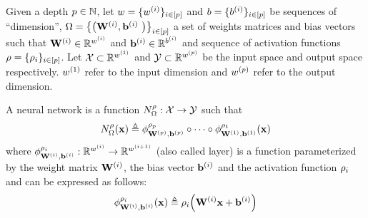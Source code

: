 \begin{definition}
  Given a depth $p \in \mathbb{N}$, 
  let $w = \{ w^{(i)} \}_{i \in [p]}$ and $b = \{ b^{(i)} \}_{i \in [p]}$ be sequences of ``dimension'', $\weights = \left\{ \left( \Wmat^{(i)}, \bvec^{(i)} \right) \right\}_{i \in [\depth]}$ a set of weights matrices and bias vectors 
  such that $\mathbf{W}^{(i)} \in \mathbb{R}^{w^{(i)}}$ and $\mathbf{b}^{(i)} \in \mathbb{R}^{b^{(i)}}$ and sequence of activation functions $\rho = \{\rho_i \}_{i \in [p]}$.
  Let $\mathcal{X} \subset \mathbb{R}^{w^{(1)}}$ and $\mathcal{Y} \subset \mathbb{R}^{w^{(p)}}$ be the input space and output space respectively. 
  $w^{(1)}$ refer to the input dimension and $w^{(p)}$ refer to the output dimension.
  
  \noindent
  A neural network is a function $N^\rho_\Omega : \mathcal{X} \rightarrow \mathcal{Y}$ such that
  \begin{equation}
    N^\rho_{\Omega}(\mathbf{x}) \triangleq \phi^{\rho_p}_{\mathbf{W}^{(p)}, \mathbf{b}^{(p)}} \circ \cdots \circ \phi^{\rho_1}_{\mathbf{W}^{(1)}, \mathbf{b}^{(1)}}(\mathbf{x})
  \end{equation}
  where $\phi^{\rho_i}_{\mathbf{W}^{(i)},\mathbf{b}^{(i)}}: \mathbb{R}^{w^{(i)}} \rightarrow \mathbb{R}^{w^{(i+1)}}$ (also called layer) is a function parameterized by the weight matrix $\mathbf{W}^{(i)}$, the bias vector $\mathbf{b}^{(i)}$ and the activation function $\rho_i$ and can be expressed as follows: 
  \begin{equation}
    \phi^{\act_i}_{\Wmat^{(i)},\bvec^{(i)}} (\xvec) \triangleq \act_i \left(\Wmat^{(i)}\xvec + \bvec^{(i)}\right)
  \end{equation}
\end{definition}



